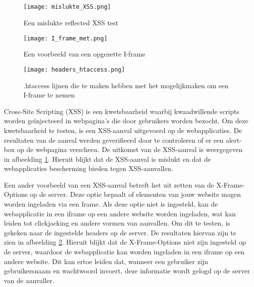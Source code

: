 \subsection{}
\begin{figure}
    \centering
    \texttt{[image: mislukte\_XSS.png]}
    \caption[Een mislukte reflected XSS test]{Een mislukte reflected XSS test}
    \label{fig:mislukte_XSS}
\end{figure}
\begin{figure}
    \centering
    \texttt{[image: I\_frame\_met.png]}
    \caption[Een voorbeeld van een opgezette I-frame]{Een voorbeeld van een opgezette I-frame}
    \label{fig:i_frame_met}
\end{figure}
\begin{figure}
    \centering
    \texttt{[image: headers\_htaccess.png]}
    \caption[.htaccess lijnen die te maken hebben met het mogelijkmaken om een I-frame te nemen]{.htaccess lijnen die te maken hebben met het mogelijkmaken om een I-frame te nemen}
    \label{fig:headers_htaccess}
\end{figure}

Cross-Site Scripting (XSS) is een kwetsbaarheid waarbij kwaadwillende scripts worden geïnjecteerd in webpagina's die door 
gebruikers worden bezocht. Om deze kwetsbaarheid te testen, is een XSS-aanval uitgevoerd op de webapplicaties. De resultaten 
van de aanval werden geverifieerd door te controleren of er een alert-box op de webpagina verscheen. De uitkomst van de 
XSS-aanval is weergegeven in afbeelding \ref{fig:mislukte_XSS}. Hieruit blijkt dat de XSS-aanval is mislukt en dat de webapplicaties
bescherming bieden tegen XSS-aanvallen.

Een ander voorbeeld van een XSS-aanval betreft het uit zetten van de X-Frame-Options op de server. Deze optie bepaalt of 
elementen van jouw website mogen worden ingeladen via een frame. Als deze optie niet is ingesteld, kan de webapplicatie in 
een iframe op een andere website worden ingeladen, wat kan leiden tot clickjacking en andere vormen van aanvallen. Om dit te 
testen, is gekeken naar de ingestelde headers op de server. De resultaten hiervan zijn te zien in afbeelding \ref{fig:i_frame_met}. 
Hieruit blijkt dat de X-Frame-Options niet zijn ingesteld op de server, waardoor de webapplicatie kan worden ingeladen in een 
iframe op een andere website. Dit kan ertoe leiden dat, wanneer een gebruiker zijn gebruikersnaam en wachtwoord
invoert, deze informatie wordt gelogd op de server van de aanvaller.

